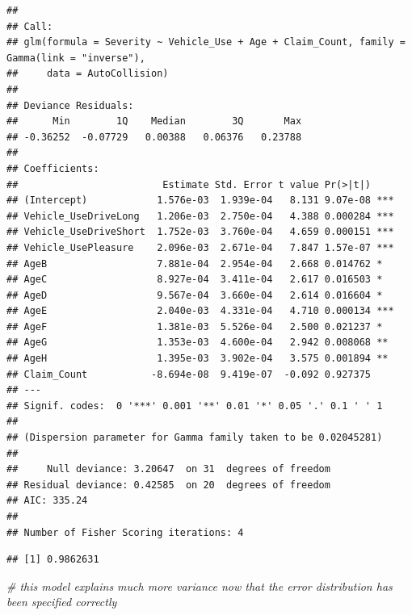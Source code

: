 \documentclass[]{book}
\newenvironment{Shaded}{\begin{snugshade}}{\end{snugshade}}
\newcommand{\DecValTok}[1]{\textcolor[rgb]{0.00,0.00,0.81}{{#1}}}
\newcommand{\StringTok}[1]{\textcolor[rgb]{0.31,0.60,0.02}{{#1}}}
\newcommand{\CommentTok}[1]{\textcolor[rgb]{0.56,0.35,0.01}{\textit{{#1}}}}
\newcommand{\NormalTok}[1]{{#1}}
\begin{document}
\begin{verbatim}
## 
## Call:
## glm(formula = Severity ~ Vehicle_Use + Age + Claim_Count, family = Gamma(link = "inverse"), 
##     data = AutoCollision)
## 
## Deviance Residuals: 
##      Min        1Q    Median        3Q       Max  
## -0.36252  -0.07729   0.00388   0.06376   0.23788  
## 
## Coefficients:
##                         Estimate Std. Error t value Pr(>|t|)    
## (Intercept)            1.576e-03  1.939e-04   8.131 9.07e-08 ***
## Vehicle_UseDriveLong   1.206e-03  2.750e-04   4.388 0.000284 ***
## Vehicle_UseDriveShort  1.752e-03  3.760e-04   4.659 0.000151 ***
## Vehicle_UsePleasure    2.096e-03  2.671e-04   7.847 1.57e-07 ***
## AgeB                   7.881e-04  2.954e-04   2.668 0.014762 *  
## AgeC                   8.927e-04  3.411e-04   2.617 0.016503 *  
## AgeD                   9.567e-04  3.660e-04   2.614 0.016604 *  
## AgeE                   2.040e-03  4.331e-04   4.710 0.000134 ***
## AgeF                   1.381e-03  5.526e-04   2.500 0.021237 *  
## AgeG                   1.353e-03  4.600e-04   2.942 0.008068 ** 
## AgeH                   1.395e-03  3.902e-04   3.575 0.001894 ** 
## Claim_Count           -8.694e-08  9.419e-07  -0.092 0.927375    
## ---
## Signif. codes:  0 '***' 0.001 '**' 0.01 '*' 0.05 '.' 0.1 ' ' 1
## 
## (Dispersion parameter for Gamma family taken to be 0.02045281)
## 
##     Null deviance: 3.20647  on 31  degrees of freedom
## Residual deviance: 0.42585  on 20  degrees of freedom
## AIC: 335.24
## 
## Number of Fisher Scoring iterations: 4
\end{verbatim}

\begin{Shaded}
\end{Shaded}

\begin{verbatim}
## [1] 0.9862631
\end{verbatim}

\begin{Shaded}
\begin{Highlighting}[]
\CommentTok{# this model explains much more variance now that the error distribution has been specified correctly}
\end{Highlighting}
\end{Shaded}
\end{document}
